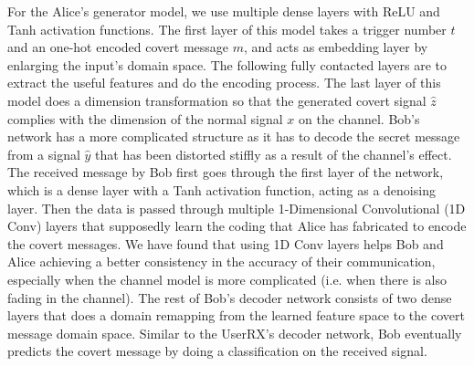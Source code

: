 For the Alice's generator model, we use multiple dense layers with ReLU and Tanh activation functions. The first layer of this model takes a trigger number \(t\) and an one-hot encoded covert message \(m\), and acts as embedding layer by enlarging the input's domain space. The following fully contacted layers are to extract the useful features and do the encoding process. The last layer of this model does a dimension transformation so that the generated covert signal \(\hat{z}\) complies with the dimension of the normal signal \(x\) on the channel. Bob's network has a more complicated structure as it has to decode the secret message from a signal \(\hat{y}\) that has been distorted stiffly as a result of the channel's effect. The received message by Bob first goes through the first layer of the network, which is a dense layer with a Tanh activation function, acting as a denoising layer. Then the data is passed through multiple 1-Dimensional Convolutional (1D Conv) layers that supposedly learn the coding that Alice has fabricated to encode the covert messages. We have found that using 1D Conv layers helps Bob and Alice achieving a better consistency in the accuracy of their communication, especially when the channel model is more complicated (i.e. when there is also fading in the channel). The rest of Bob's decoder network consists of two dense layers that does a domain remapping from the learned feature space to the covert message domain space. Similar to the UserRX's decoder network, Bob eventually predicts the covert message by doing a classification on the received signal.


